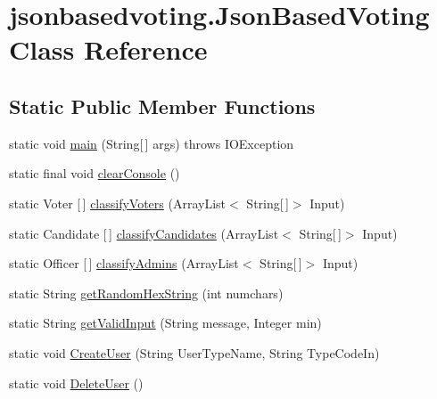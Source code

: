 \hypertarget{classjsonbasedvoting_1_1_json_based_voting}{}\section{jsonbasedvoting.\+Json\+Based\+Voting Class Reference}
\label{classjsonbasedvoting_1_1_json_based_voting}
\subsection*{Static Public Member Functions}
\begin{DoxyCompactItemize}
\item 
static void \mbox{\hyperlink{classjsonbasedvoting_1_1_json_based_voting_a39d87f4c78499d4c595529d34b656f82}{main}} (String\mbox{[}$\,$\mbox{]} args)  throws I\+O\+Exception 
\item 
static final void \mbox{\hyperlink{classjsonbasedvoting_1_1_json_based_voting_a1d797d0d870297df5f50f56ab63fb7d8}{clear\+Console}} ()
\item 
static Voter \mbox{[}$\,$\mbox{]} \mbox{\hyperlink{classjsonbasedvoting_1_1_json_based_voting_a6f76956192c5ec8d7704c20bcc967d91}{classify\+Voters}} (Array\+List$<$ String\mbox{[}$\,$\mbox{]}$>$ Input)
\item 
static Candidate \mbox{[}$\,$\mbox{]} \mbox{\hyperlink{classjsonbasedvoting_1_1_json_based_voting_a09a09c0673c510a648d225136e4cf259}{classify\+Candidates}} (Array\+List$<$ String\mbox{[}$\,$\mbox{]}$>$ Input)
\item 
static Officer \mbox{[}$\,$\mbox{]} \mbox{\hyperlink{classjsonbasedvoting_1_1_json_based_voting_a8ae3b015105859acfa80cfcf3e481174}{classify\+Admins}} (Array\+List$<$ String\mbox{[}$\,$\mbox{]}$>$ Input)
\item 
static String \mbox{\hyperlink{classjsonbasedvoting_1_1_json_based_voting_a1bce9a2d9ca3518b754e4f4506826b7b}{get\+Random\+Hex\+String}} (int numchars)
\item 
static String \mbox{\hyperlink{classjsonbasedvoting_1_1_json_based_voting_ac532552d0367e4f16155ea8bec904f88}{get\+Valid\+Input}} (String message, Integer min)
\item 
static void \mbox{\hyperlink{classjsonbasedvoting_1_1_json_based_voting_ad2f672b45638c0a0767c01bf51c8098a}{Create\+User}} (String User\+Type\+Name, String Type\+Code\+In)
\item 
static void \mbox{\hyperlink{classjsonbasedvoting_1_1_json_based_voting_ac203bbbbb46504b4239c28d595e1cdfc}{Delete\+User}} ()

\end{DoxyCompactItemize}

